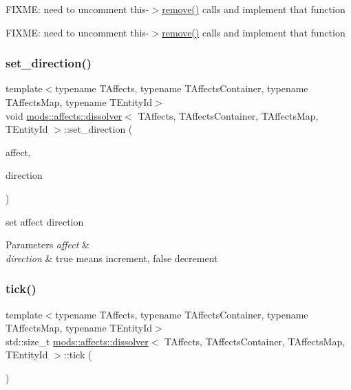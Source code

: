 F\+I\+X\+ME\+: need to uncomment this-\/$>$\hyperlink{structmods_1_1affects_1_1dissolver_ad8059ffe681c083c83ec0fa82ef82a9b}{remove()} calls and implement that function

F\+I\+X\+ME\+: need to uncomment this-\/$>$\hyperlink{structmods_1_1affects_1_1dissolver_ad8059ffe681c083c83ec0fa82ef82a9b}{remove()} calls and implement that function \mbox{\label{structmods_1_1affects_1_1dissolver_a35c94d35d686bf871fd29aba834ec150}} 
\subsubsection{\texorpdfstring{set\+\_\+direction()}{set\_direction()}}
{\footnotesize\ttfamily template$<$typename T\+Affects, typename T\+Affects\+Container, typename T\+Affects\+Map, typename T\+Entity\+Id$>$ \\
void \hyperlink{structmods_1_1affects_1_1dissolver}{mods\+::affects\+::dissolver}$<$ T\+Affects, T\+Affects\+Container, T\+Affects\+Map, T\+Entity\+Id $>$\+::set\+\_\+direction (\begin{DoxyParamCaption}\item[{T\+Affects}]{affect,  }\item[{bool}]{direction }\end{DoxyParamCaption})\hspace{0.3cm}{\ttfamily [inline]}}



set affect direction 


\begin{DoxyParams}{Parameters}
{\em affect} & \\
\hline
{\em direction} & true means increment, false decrement \\
\hline
\end{DoxyParams}
\mbox{\label{structmods_1_1affects_1_1dissolver_a26d75b016d86619cb74f80418f98bc10}} 
\subsubsection{\texorpdfstring{tick()}{tick()}}
{\footnotesize\ttfamily template$<$typename T\+Affects, typename T\+Affects\+Container, typename T\+Affects\+Map, typename T\+Entity\+Id$>$ \\
std\+::size\+\_\+t \hyperlink{structmods_1_1affects_1_1dissolver}{mods\+::affects\+::dissolver}$<$ T\+Affects, T\+Affects\+Container, T\+Affects\+Map, T\+Entity\+Id $>$\+::tick (\begin{DoxyParamCaption}{ }\end{DoxyParamCaption})\hspace{0.3cm}{\ttfamily [inline]}}

